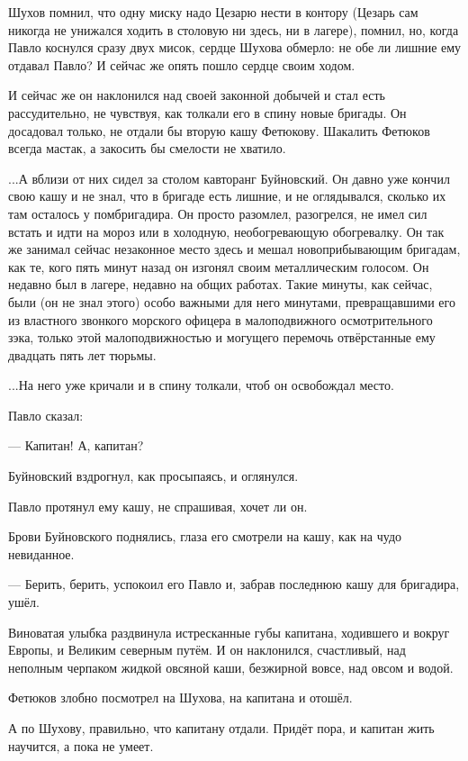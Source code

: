 Шухов помнил, что одну миску надо Цезарю нести в контору (Цезарь сам никогда не унижался
ходить в столовую ни здесь, ни в лагере), \dash помнил, но, когда Павло коснулся сразу двух мисок,
сердце Шухова обмерло: не обе ли лишние ему отдавал Павло? И сейчас же опять пошло сердце
своим ходом.

И сейчас же он наклонился над своей законной добычей и стал есть рассудительно, не чувствуя,
как толкали его в спину новые бригады. Он досадовал только, не отдали бы вторую кашу
Фетюкову. Шакалить Фетюков всегда мастак, а закосить бы смелости не хватило.

...А вблизи от них сидел за столом кавторанг Буйновский. Он давно уже кончил свою кашу и не
знал, что в бригаде есть лишние, и не оглядывался, сколько их там осталось у помбригадира. Он
просто разомлел, разогрелся, не имел сил встать и идти на мороз или в холодную,
необогревающую обогревалку. Он так же занимал сейчас незаконное место здесь и мешал
новоприбывающим бригадам, как те, кого пять минут назад он изгонял своим металлическим
голосом. Он недавно был в лагере, недавно на общих работах. Такие минуты, как сейчас, были (он
не знал этого) особо важными для него минутами, превращавшими его из властного звонкого
морского офицера в малоподвижного осмотрительного зэка, только этой малоподвижностью и
могущего перемочь отвёрстанные ему двадцать пять лет тюрьмы.

...На него уже кричали и в спину толкали, чтоб он освобождал место.

Павло сказал:

--- Капитан! А, капитан?

Буйновский вздрогнул, как просыпаясь, и оглянулся.

Павло протянул ему кашу, не спрашивая, хочет ли он.

Брови Буйновского поднялись, глаза его смотрели на кашу, как на чудо невиданное.

--- Берить, берить, \dash успокоил его Павло и, забрав последнюю кашу для бригадира, ушёл.

Виноватая улыбка раздвинула истресканные губы капитана, ходившего и вокруг Европы, и
Великим северным путём. И он наклонился, счастливый, над неполным черпаком жидкой овсяной
каши, безжирной вовсе, \dash над овсом и водой.

Фетюков злобно посмотрел на Шухова, на капитана и отошёл.

А по Шухову, правильно, что капитану отдали. Придёт пора, и капитан жить научится, а пока не
умеет.

